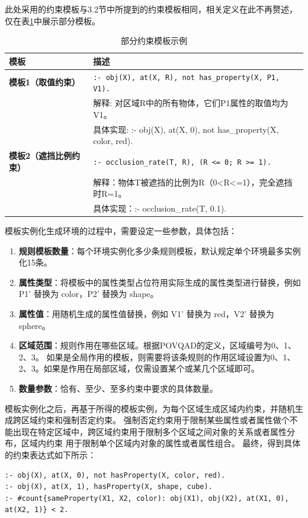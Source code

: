 此处采用的约束模板与3.2节中所提到的约束模板相同，相关定义在此不再赘述，仅在表\ref{tab:asp_templates}中展示部分模板。
\begin{table}[h]
    \centering
    \renewcommand{\arraystretch}{1.0}
    \begin{tabular}{|p{2.8cm}|p{12.2cm}|}
        \hline
        \textbf{模板} & \textbf{描述} \\
        \hline
        \textbf{模板1（取值约束）} & 
        \texttt{:- obj(X), at(X, R), not has\_property(X, P1, V1).} \\ 
        & 解释: 对区域R中的所有物体，它们P1属性的取值均为V1。 \\ 
        & 具体实现: :- obj(X), at(X, 0), not has\_property(X, color, red). \\
        \hline
        \textbf{模板2（遮挡比例约束）} & 
        \texttt{:- occlusion\_rate(T, R), (R <= 0; R >= 1).} \\ 
        & 解释：物体T被遮挡的比例为R（0<R<=1），完全遮挡时R=1。 \\ 
        & 具体实现：:- occlusion\_rate(T, 0.1). \\
        \hline
    \end{tabular}
    \caption{部分约束模板示例}
    \label{tab:asp_templates}
\end{table}

模板实例化生成环境的过程中，需要设定一些参数，具体包括：
\begin{enumerate}[nosep]
\item \textbf{规则模板数量}：每个环境实例化多少条规则模板，默认规定单个环境最多实例化15条。
\item \textbf{属性类型}：将模板中的属性类型占位符用实际生成的属性类型进行替换，例如 P1' 替换为 color，P2' 替换为 shape。
\item \textbf{属性值}：用随机生成的属性值替换，例如 V1' 替换为 red，V2' 替换为 sphere。
\item \textbf{区域范围}：规则作用在哪些区域。根据POVQAD的定义，区域编号为0、1、2、3。
如果是全局作用的模板，则需要将该条规则的作用区域设置为0、1、2、3。如果是作用在局部区域，仅需设置某个或某几个区域即可。
\item \textbf{数量参数}：恰有、至少、至多约束中要求的具体数量。
\end{enumerate}

模板实例化之后，再基于所得的模板实例，为每个区域生成区域内约束，并随机生成跨区域约束和强制否定约束。
强制否定约束用于限制某些属性或者属性做个不能出现在特定区域中，跨区域约束用于限制多个区域之间对象的关系或者属性分布，区域内约束
用于限制单个区域内对象的属性或者属性组合。
最终，得到具体的约束表达式如下所示：
\begin{lstlisting}
:- obj(X), at(X, 0), not hasProperty(X, color, red).
:- obj(X), at(X, 1), hasProperty(X, shape, cube).
:- #count{sameProperty(X1, X2, color): obj(X1), obj(X2), at(X1, 0), at(X2, 1)} < 2.
\end{lstlisting}

